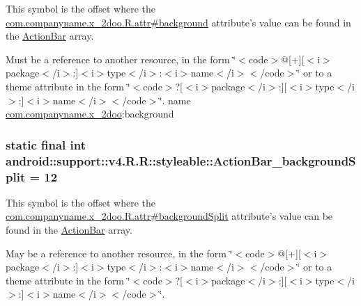 This symbol is the offset where the \hyperlink{classcom_1_1companyname_1_1x__2doo_1_1_r_1_1attr_fc97d2bd51d655faed306bf08124fc83}{com.companyname.x\_\-2doo.R.attr\#background} attribute's value can be found in the \hyperlink{classandroid_1_1support_1_1v4_1_1_r_1_1styleable_5c6cf2c83551ebae05f365bb913fdddf}{ActionBar} array.

Must be a reference to another resource, in the form \char`\"{}$<$code$>$@\mbox{[}+\mbox{]}\mbox{[}$<$i$>$package$<$/i$>$:\mbox{]}$<$i$>$type$<$/i$>$:$<$i$>$name$<$/i$>$$<$/code$>$\char`\"{} or to a theme attribute in the form \char`\"{}$<$code$>$?\mbox{[}$<$i$>$package$<$/i$>$:\mbox{]}\mbox{[}$<$i$>$type$<$/i$>$:\mbox{]}$<$i$>$name$<$/i$>$$<$/code$>$\char`\"{}.  name \hyperlink{namespacecom_1_1companyname_1_1x__2doo}{com.companyname.x\_\-2doo}:background \hypertarget{classandroid_1_1support_1_1v4_1_1_r_1_1styleable_94fcfd07399863e568786b26bbb3deed}{
\subsubsection[{ActionBar\_\-backgroundSplit}]{\setlength{\rightskip}{0pt plus 5cm}static final int android::support::v4.R.R::styleable::ActionBar\_\-backgroundSplit = 12}}
\label{classandroid_1_1support_1_1v4_1_1_r_1_1styleable_94fcfd07399863e568786b26bbb3deed}


This symbol is the offset where the \hyperlink{classcom_1_1companyname_1_1x__2doo_1_1_r_1_1attr_8fda96db8ccf56c969203da5517b488e}{com.companyname.x\_\-2doo.R.attr\#backgroundSplit} attribute's value can be found in the \hyperlink{classandroid_1_1support_1_1v4_1_1_r_1_1styleable_5c6cf2c83551ebae05f365bb913fdddf}{ActionBar} array.

May be a reference to another resource, in the form \char`\"{}$<$code$>$@\mbox{[}+\mbox{]}\mbox{[}$<$i$>$package$<$/i$>$:\mbox{]}$<$i$>$type$<$/i$>$:$<$i$>$name$<$/i$>$$<$/code$>$\char`\"{} or to a theme attribute in the form \char`\"{}$<$code$>$?\mbox{[}$<$i$>$package$<$/i$>$:\mbox{]}\mbox{[}$<$i$>$type$<$/i$>$:\mbox{]}$<$i$>$name$<$/i$>$$<$/code$>$\char`\"{}. 

